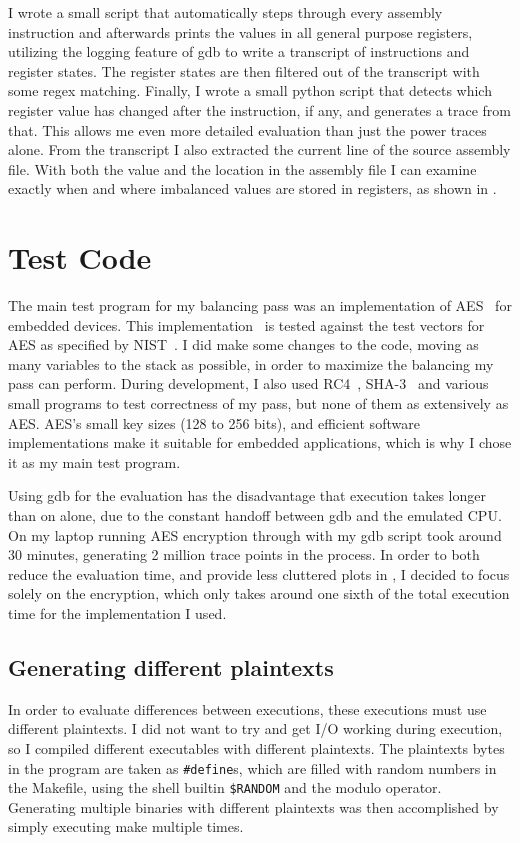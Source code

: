 I wrote a small script that automatically steps through every assembly instruction and afterwards prints the values in all general purpose registers, utilizing the logging feature of gdb to write a transcript of instructions and register states.
The register states are then filtered out of the transcript with some regex matching.
Finally, I wrote a small python script that detects which register value has changed after the instruction, if any, and generates a trace from that.
This allows me even more detailed evaluation than just the power traces alone.
From the transcript I also extracted the current line of the source assembly file.
With both the value and the location in the assembly file I can examine exactly when and where imbalanced values are stored in registers, as shown in .

\section{Test Code}
The main test program for my balancing pass was an implementation of AES~\cite{daemen2013design} for embedded devices.
This implementation~\cite{tinyaes} is tested against the test vectors for AES as specified by NIST~\cite{dworkin2001recommendation}.
I did make some changes to the code, moving as many variables to the stack as possible, in order to maximize the balancing my pass can perform.
During development, I also used RC4~\cite{rc4}, SHA-3~\cite{bertoni2013keccak} and various small programs to test correctness of my pass, but none of them as extensively as AES.
AES's small key sizes (128 to 256 bits), and efficient software implementations make it suitable for embedded applications, which is why I chose it as my main test program.

Using gdb for the evaluation has the disadvantage that execution takes longer than on \qemu{} alone, due to the constant handoff between gdb and the emulated CPU.
On my laptop running AES encryption through \qemu{} with my gdb script took around 30 minutes, generating 2 million trace points in the process.
In order to both reduce the evaluation time, and provide less cluttered plots in , I decided to focus solely on the encryption, which only takes around one sixth of the total execution time for the implementation I used.

\subsection{Generating different plaintexts}
In order to evaluate \hammingw{} differences between executions, these executions must use different plaintexts.
I did not want to try and get I/O working during execution, so I compiled different executables with different plaintexts.
The plaintexts bytes in the program are taken as \texttt{\#define}s, which are filled with random numbers in the Makefile, using the shell builtin \texttt{\$RANDOM} and the modulo operator.
Generating multiple binaries with different plaintexts was then accomplished by simply executing make multiple times.

